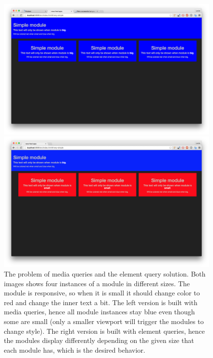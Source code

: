 \documentclass[a4paper,11pt]{kth-mag}
\begin{document}
      \begin{figure}
        \centering
        \begin{minipage}{.5\textwidth}
          \centering
          \includegraphics[width=\linewidth]{images/mq-big}
        \end{minipage}%
        \begin{minipage}{.5\textwidth}
          \centering
          \includegraphics[width=\linewidth]{images/eq-big}
        \end{minipage}
        \caption{
          The problem of media queries and the element query solution.
          Both images shows four instances of a module in different sizes.
          The module is responsive, so when it is small it should change color to red and change the inner text a bit.
          The left version is built with media queries, hence all module instances stay blue even though some are small (only a smaller viewport will trigger the modules to change style).
          The right version is built with element queries, hence the modules display differently depending on the given size that each module has, which is the desired behavior.}
        \label{fig:mq-vs-eq}
      \end{figure}
\end{document}
